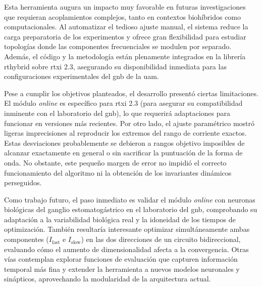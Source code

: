 Esta herramienta augura un impacto muy favorable en futuras investigaciones que requieran acoplamientos complejos, tanto en contextos biohíbridos como computacionales. Al automatizar el tedioso ajuste manual, el sistema reduce la carga preparatoria de los experimentos y ofrece gran flexibilidad para estudiar topologías donde las componentes frecuenciales se modulen por separado. Además, el código y la metodología están plenamente integrados en la librería \ac{rthybrid} sobre \ac{rtxi} 2.3, asegurando su disponibilidad inmediata para las configuraciones experimentales del \ac{gnb} de la \ac{uam}.

Pese a cumplir los objetivos planteados, el desarrollo presentó ciertas limitaciones. El módulo \textit{online} es específico para \ac{rtxi} 2.3 (para asegurar su compatibilidad inminente con el laboratorio del \ac{gnb}), lo que requerirá adaptaciones para funcionar en versiones más recientes. Por otro lado, el ajuste paramétrico mostró ligeras imprecisiones al reproducir los extremos del rango de corriente exactos. Estas desviaciones probablemente se debieron a rangos objetivo imposibles de alcanzar exactamente en general o sin sacrificar la puntuación de la forma de onda. No obstante, este pequeño margen de error no impidió el correcto funcionamiento del algoritmo ni la obtención de los invariantes dinámicos perseguidos.

Como trabajo futuro, el paso inmediato es validar el módulo \textit{online} con neuronas biológicas del ganglio estomatogástrico en el laboratorio del \ac{gnb}, comprobando su adaptación a la variabilidad biológica real y la idoneidad de los tiempos de optimización. También resultaría interesante optimizar simultáneamente ambas componentes ($I_{\mathrm{fast}}$ e $I_{\mathrm{slow}}$) en las dos direcciones de un circuito bidireccional, evaluando cómo el aumento de dimensionalidad afecta a la convergencia. Otras vías contemplan explorar funciones de evaluación que capturen información temporal más fina y extender la herramienta a nuevos modelos neuronales y sinápticos, aprovechando la modularidad de la arquitectura actual.
